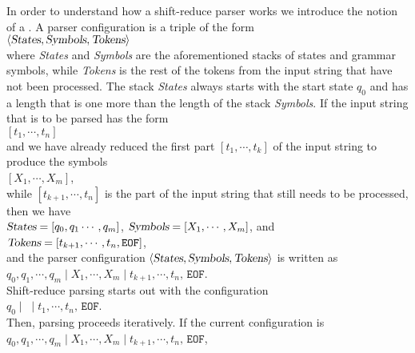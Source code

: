 In order to understand how a shift-reduce parser works we introduce the notion of a
.  A parser configuration is a triple of the form
\\[0.2cm]
\hspace*{1.3cm}
$\langle\textsl{States}, \textsl{Symbols}, \textsl{Tokens} \rangle$
\\[0.2cm]
where \textsl{States} and \textsl{Symbols} are the aforementioned stacks of states and grammar symbols, while
\textsl{Tokens} is the rest of the 
tokens from the input string that have not been processed.  The stack \textsl{States} always starts with the
start state $q_0$ and has a length that is one more than the length of the stack \textsl{Symbols}.
If the input string that is to be parsed has the form
\\[0.2cm]
\hspace*{1.3cm}
$[t_1, \cdots,t_n]$
\\[0.2cm]
and we have already reduced the first part $[t_1, \cdots,t_k]$ of the input string to produce the symbols 
\\[0.2cm]
\hspace*{1.3cm}
$[X_1,\cdots, X_m]$,
\\[0.2cm]
while $[t_{k+1},\cdots,t_n]$ is the part of the input string that still needs to be processed, then we have
\\[0.2cm]
\hspace*{1.3cm}
$\textsl{States} = [q_0,q_1\cdots, q_m]$, \quad $\textsl{Symbols} = [X_1,\cdots, X_m]$,
\quad and \quad $\textsl{Tokens} = [t_{k+1}, \cdots, t_n, \mathtt{EOF}]$,
\\[0.2cm]
and the parser configuration $\langle \textsl{States}, \textsl{Symbols}, \textsl{Tokens} \rangle$ is written as
\\[0.2cm]
\hspace*{1.3cm}
$q_0, q_1, \cdots, q_m \mid X_1, \cdots, X_m \mid t_{k+1}, \cdots, t_n,\, \mathtt{EOF}$.
\\[0.2cm]
Shift-reduce parsing starts out with the configuration
\\[0.2cm]
\hspace*{1.3cm}
$q_0 \mid \;  \mid t_{1}, \cdots, t_n,\, \mathtt{EOF}$.
\\[0.2cm] 
Then, parsing proceeds iteratively.  If the current configuration is
\\[0.2cm]
\hspace*{1.3cm}
$q_0, q_1, \cdots, q_m \mid X_1, \cdots, X_m \mid t_{k+1}, \cdots, t_n, \,\mathtt{EOF}$,
\\[0.2cm]
